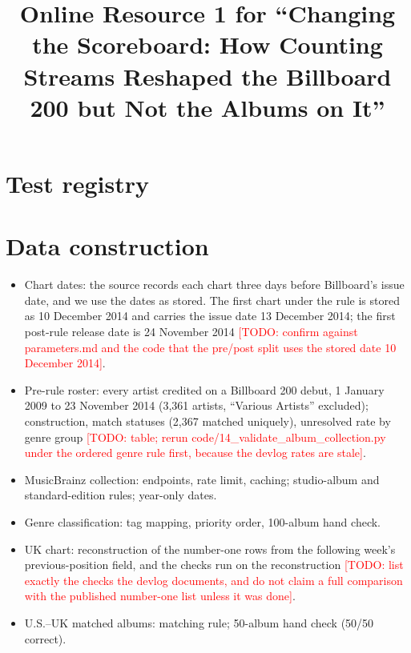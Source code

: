 \documentclass[pdflatex,sn-apa]{sn-jnl}
\newcommand{\todo}[1]{\textcolor{red}{[TODO: #1]}}
\begin{document}
\title{Online Resource 1 for ``Changing the Scoreboard: How Counting Streams Reshaped the Billboard 200 but Not the Albums on It''}
\author*[1]{ }
\maketitle

\section{Test registry}


\section{Data construction}
\begin{itemize}
  \item Chart dates: the source records each chart three days before Billboard's issue date, and we use the dates as stored. The first chart under the rule is stored as 10 December 2014 and carries the issue date 13 December 2014; the first post-rule release date is 24 November 2014 \todo{confirm against parameters.md and the code that the pre/post split uses the stored date 10 December 2014}.
  \item Pre-rule roster: every artist credited on a Billboard 200 debut, 1 January 2009 to 23 November 2014 (3,361 artists, ``Various Artists'' excluded); construction, match statuses (2,367 matched uniquely), unresolved rate by genre group \todo{table; rerun code/14\_validate\_album\_collection.py under the ordered genre rule first, because the devlog rates are stale}.
  \item MusicBrainz collection: endpoints, rate limit, caching; studio-album and standard-edition rules; year-only dates.
  \item Genre classification: tag mapping, priority order, 100-album hand check.
  \item UK chart: reconstruction of the number-one rows from the following week's previous-position field, and the checks run on the reconstruction \todo{list exactly the checks the devlog documents, and do not claim a full comparison with the published number-one list unless it was done}.
  \item U.S.--UK matched albums: matching rule; 50-album hand check (50/50 correct).
\end{itemize}
\end{document}
